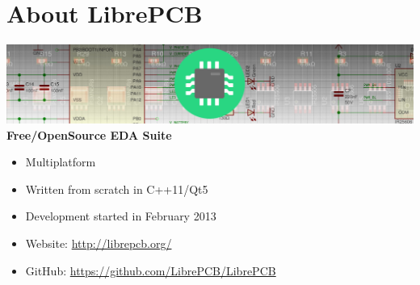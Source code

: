 \section{About LibrePCB}

\begin{frame}{\secname}
  \includegraphics[width=\linewidth]{images/about_header.png} \linebreak\linebreak
  \textbf{Free/OpenSource EDA Suite}
  \begin{itemize}
    \item Multiplatform \faLinux\ \faApple\ \faWindows\
    \item Written from scratch in C++11/Qt5
    \item Development started in February 2013
    \item Website: \url{http://librepcb.org/}
    \item GitHub: \url{https://github.com/LibrePCB/LibrePCB}
  \end{itemize}
\end{frame}
